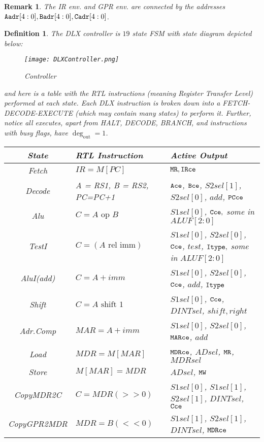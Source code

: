 \documentclass[12pt]{article}
\newcommand*{\degout}{\deg_{\text{out}}}
\newtheorem{definition}[theorem]{Definition}
\newtheorem{remark}[theorem]{Remark}
\begin{document}
\begin{remark}
  The IR env. and GPR env. are connected by the addresses ${\tt Aadr}[4:0],{\tt Badr}[4:0],{\tt Cadr}[4:0]$.
\end{remark}

\begin{definition}
  The DLX controller is $19$ state FSM with state diagram depicted below:
  \begin{figure}[H]
    \centering
    \texttt{[image: DLXController.png]}
    \caption{Controller}
    \label{controller}
  \end{figure}
  \noindent and here is a table with the RTL instructions (meaning Register Transfer Level) performed at each state. Each DLX instruction is broken down into a FETCH-DECODE-EXECUTE (which may contain many states) to perform it. Further, notice all executes, apart from HALT, DECODE, BRANCH, and instructions with busy flags, have $\degout = 1$. 
  \begin{table}[H]
    \centering
    \begin{tabular}{|c|p{4cm}|p{4cm}|}
      \hline
      State & RTL Instruction & Active Output \\\hline
      Fetch & $IR = M[PC]$ & ${\tt MR}, {\tt IRce}$ \\\hline
      Decode & A = RS1, B = RS2, PC=PC+1 & ${\tt Ace}$, ${\tt Bce}$, $S2sel[1]$, $S2sel[0]$, $add$, ${\tt PCce}$ \\\hline
      Alu & $C = A\text{ op }B$ & $S1sel[0]$, ${\tt Cce},$ some in $ALUF[2:0]$\\\hline
      TestI & $C = (A\text{ rel imm})$ & $S1sel[0]$, $S2sel[0]$, ${\tt Cce}$, $test$, ${\tt Itype},$ some in $ALUF[2:0]$ \\\hline
      AluI(add) & $C = A + imm$ & $S1sel[0]$, $S2sel[0]$, ${\tt Cce}$, $add$, ${\tt Itype}$ \\\hline
      Shift & $C = A\text{ shift }1$ & $S1sel[0]$, ${\tt Cce}$, $DINTsel$, $shift ,right$\\\hline
      Adr.Comp & $MAR = A + imm$ & $S1sel[0]$, $S2sel[0]$, ${\tt MARce}$, $add$ \\\hline
      Load & $MDR = M[MAR]$ & ${\tt MDRce}$, $ADsel$, ${\tt MR}$, $MDRsel$ \\\hline
      Store & $M[MAR] = MDR$ & $ADsel$, ${\tt MW}$ \\\hline
      CopyMDR2C & $C = MDR(>> 0)$ & $S1sel[0]$, $S1sel[1]$, $S2sel[1]$, $DINTsel$, ${\tt Cce}$ \\\hline
      CopyGPR2MDR & $MDR = B(<< 0)$ & $S1sel[1]$, $S2sel[1]$, $DINTsel$, ${\tt MDRce}$ \\\hline

\end{tabular}
\end{table}
\end{definition}
\end{document}
